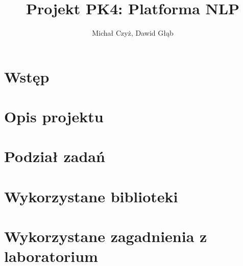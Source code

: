 \documentclass{article}
\title{Projekt PK4: Platforma NLP}
\author{Michał Czyż, Dawid Głąb}
\begin{document}
\maketitle

\section{Wstęp}

\section{Opis projektu}

\section{Podział zadań}

\section{Wykorzystane biblioteki}

\section{Wykorzystane zagadnienia z laboratorium}
\end{document}
